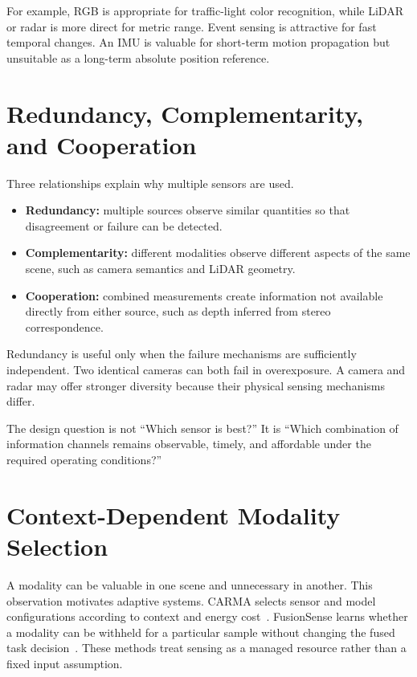 For example, RGB is appropriate for traffic-light color recognition, while LiDAR or radar is more direct for metric range. Event sensing is attractive for fast temporal changes. An IMU is valuable for short-term motion propagation but unsuitable as a long-term absolute position reference.

\section{Redundancy, Complementarity, and Cooperation}

Three relationships explain why multiple sensors are used.

\begin{itemize}
    \item \textbf{Redundancy:} multiple sources observe similar quantities so that disagreement or failure can be detected.
    \item \textbf{Complementarity:} different modalities observe different aspects of the same scene, such as camera semantics and LiDAR geometry.
    \item \textbf{Cooperation:} combined measurements create information not available directly from either source, such as depth inferred from stereo correspondence.
\end{itemize}

Redundancy is useful only when the failure mechanisms are sufficiently independent. Two identical cameras can both fail in overexposure. A camera and radar may offer stronger diversity because their physical sensing mechanisms differ.

\begin{keyinsight}
The design question is not ``Which sensor is best?'' It is ``Which combination of information channels remains observable, timely, and affordable under the required operating conditions?''
\end{keyinsight}

\section{Context-Dependent Modality Selection}

A modality can be valuable in one scene and unnecessary in another. This observation motivates adaptive systems. CARMA selects sensor and model configurations according to context and energy cost~\cite{zhang2023carma}. FusionSense learns whether a modality can be withheld for a particular sample without changing the fused task decision~\cite{yun2026fusionsense}. These methods treat sensing as a managed resource rather than a fixed input assumption.

